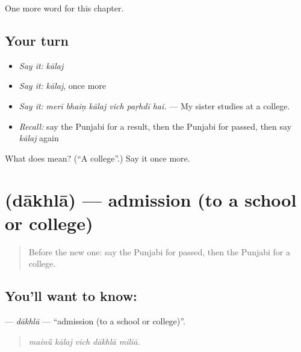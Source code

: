 \begin{grammarlens}[title={What you've built}]
One more word for this chapter.
\end{grammarlens}

\subsection*{Your turn}
\begin{itemize}
\raggedright
  \item \emph{Say it:} \emph{kālaj}
  \item \emph{Say it:} \emph{kālaj}, once more
  \item \emph{Say it:} \emph{merī bhaiṇ kālaj vich paṛhdī hai.} — My sister studies at a college.
  \item \emph{Recall:} say the Punjabi for a result, then the Punjabi for passed, then say \emph{kālaj} again
\end{itemize}

\begin{tcolorbox}[breakable,colback=teal!4,colframe=teal!35!black,title={Before you move on}]
What does  mean? (\textquotedblleft{}A college\textquotedblright{}.) Say it once more.
\end{tcolorbox}
\section[\texorpdfstring{\pa{ਦਾਖ਼ਲਾ} (dākhlā)}{ਦਾਖ਼ਲਾ (dākhlā)}]{ (dākhlā) — admission (to a school or college)}

\label{lesson:PA-C361-dakhla}



\begin{quote}
Before the new one: say the Punjabi for passed, then the Punjabi for a college.
\end{quote}

\subsection*{You'll want to know: }
\textbf{} — \emph{dākhlā} — \textquotedblleft{}admission (to a school or college)\textquotedblright{}.

\begin{quote}
    
\end{quote}

\begin{quote}
\emph{mainū̃ kālaj vich dākhlā miliā.}
\end{quote}

